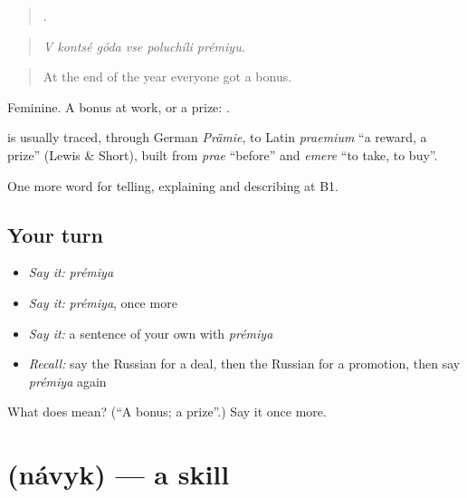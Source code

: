 \begin{quote}
     .
\end{quote}

\begin{quote}
\emph{V kontsé góda vse poluchíli prémiyu.}
\end{quote}

\begin{quote}
At the end of the year everyone got a bonus.
\end{quote}

Feminine. A bonus at work, or a prize: \emph{ }.

\begin{cousinweb}
\textbf{} is usually traced, through German \emph{Prämie}, to Latin \emph{praemium} \textquotedblleft{}a reward, a prize\textquotedblright{} (Lewis \& Short), built from \emph{prae} \textquotedblleft{}before\textquotedblright{} and \emph{emere} \textquotedblleft{}to take, to buy\textquotedblright{}.
\end{cousinweb}

\begin{grammarlens}[title={What you've built}]
One more word for telling, explaining and describing at B1.
\end{grammarlens}

\subsection*{Your turn}
\begin{itemize}
\raggedright
  \item \emph{Say it:} \emph{prémiya}
  \item \emph{Say it:} \emph{prémiya}, once more
  \item \emph{Say it:} a sentence of your own with \emph{prémiya}
  \item \emph{Recall:} say the Russian for a deal, then the Russian for a promotion, then say \emph{prémiya} again
\end{itemize}

\begin{tcolorbox}[breakable,colback=teal!4,colframe=teal!35!black,title={Before you move on}]
What does  mean? (\textquotedblleft{}A bonus; a prize\textquotedblright{}.) Say it once more.
\end{tcolorbox}
\section[\texorpdfstring{\ru{навык} (návyk)}{навык (návyk)}]{ (návyk) — a skill}

